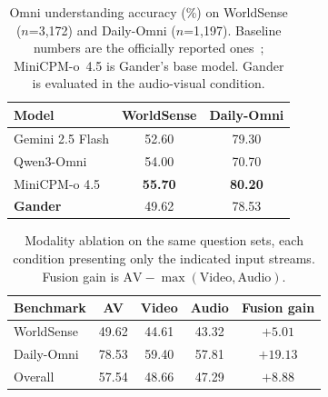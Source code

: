 \begin{table}[t]
    \centering
    \caption{
        Omni understanding accuracy (\%) on WorldSense ($n$=3{,}172) and Daily-Omni
        ($n$=1{,}197). Baseline numbers are the officially reported
        ones~\cite{cui2026minicpm}; MiniCPM-o~4.5 is Gander's base model. Gander is evaluated
        in the audio-visual condition.
    }
    \label{tab:omni_main}
    \small
    \setlength{\tabcolsep}{6pt}
    \renewcommand{\arraystretch}{1.10}
    \begin{tabular}{lcc}
        \toprule
        \textbf{Model}
        & \textbf{WorldSense}
        & \textbf{Daily-Omni} \\
        \midrule
        Gemini 2.5 Flash   & 52.60 & 79.30 \\
        Qwen3-Omni         & 54.00 & 70.70 \\
        MiniCPM-o 4.5      & \textbf{55.70} & \textbf{80.20} \\
        \midrule
        \textbf{Gander}    & 49.62 & 78.53 \\
        \bottomrule
    \end{tabular}
\end{table}

\begin{table}[t]
    \centering
    \caption{
        Modality ablation on the same question sets, each condition presenting only the
        indicated input streams. Fusion gain is
        $\text{AV}-\max(\text{Video},\text{Audio})$.
    }
    \label{tab:omni_ablation}
    \small
    \setlength{\tabcolsep}{6pt}
    \renewcommand{\arraystretch}{1.10}
    \begin{tabular}{lcccc}
        \toprule
        \textbf{Benchmark} & \textbf{AV} & \textbf{Video} & \textbf{Audio}
        & \textbf{Fusion gain} \\
        \midrule
        WorldSense & 49.62 & 44.61 & 43.32 & $+5.01$ \\
        Daily-Omni & 78.53 & 59.40 & 57.81 & $+19.13$ \\
        \midrule
        Overall    & 57.54 & 48.66 & 47.29 & $+8.88$ \\
        \bottomrule
    \end{tabular}
\end{table}
